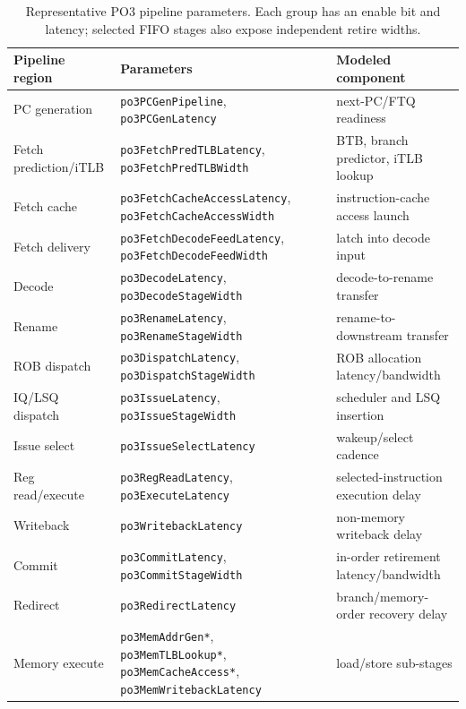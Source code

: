 \documentclass[10pt,twocolumn]{article}
\newcommand{\po}{\textsc{PO3}}
\begin{document}
\begin{table}[t]
\centering
\caption{Representative \po{} pipeline parameters.  Each group has an enable bit and latency; selected FIFO stages also expose independent retire widths.}
\label{tab:params}
\begin{tabular}{lll}
\toprule
Pipeline region & Parameters & Modeled component \\
\midrule
PC generation & \texttt{po3PCGenPipeline}, \texttt{po3PCGenLatency} & next-PC/FTQ readiness \\
Fetch prediction/iTLB & \texttt{po3FetchPredTLBLatency}, \texttt{po3FetchPredTLBWidth} & BTB, branch predictor, iTLB lookup \\
Fetch cache & \texttt{po3FetchCacheAccessLatency}, \texttt{po3FetchCacheAccessWidth} & instruction-cache access launch \\
Fetch delivery & \texttt{po3FetchDecodeFeedLatency}, \texttt{po3FetchDecodeFeedWidth} & latch into decode input \\
Decode & \texttt{po3DecodeLatency}, \texttt{po3DecodeStageWidth} & decode-to-rename transfer \\
Rename & \texttt{po3RenameLatency}, \texttt{po3RenameStageWidth} & rename-to-downstream transfer \\
ROB dispatch & \texttt{po3DispatchLatency}, \texttt{po3DispatchStageWidth} & ROB allocation latency/bandwidth \\
IQ/LSQ dispatch & \texttt{po3IssueLatency}, \texttt{po3IssueStageWidth} & scheduler and LSQ insertion \\
Issue select & \texttt{po3IssueSelectLatency} & wakeup/select cadence \\
Reg read/execute & \texttt{po3RegReadLatency}, \texttt{po3ExecuteLatency} & selected-instruction execution delay \\
Writeback & \texttt{po3WritebackLatency} & non-memory writeback delay \\
Commit & \texttt{po3CommitLatency}, \texttt{po3CommitStageWidth} & in-order retirement latency/bandwidth \\
Redirect & \texttt{po3RedirectLatency} & branch/memory-order recovery delay \\
Memory execute & \texttt{po3MemAddrGen*}, \texttt{po3MemTLBLookup*}, \texttt{po3MemCacheAccess*}, \texttt{po3MemWritebackLatency} & load/store sub-stages \\
\bottomrule
\end{tabular}
\end{table}
\end{document}
